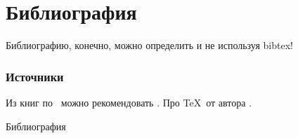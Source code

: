 \section{Библиография}

Библиографию, конечно, можно определить и не используя bibtex!

\begin{frame}
    \frametitle{Источники}
    
    Из книг по \LaTeXe\ можно рекомендовать \cite{bib:cotelnikov,bib:baldin}. Про \TeX\ от автора \cite{bib:knuth:AllAbout}.
\end{frame}


\begin{frame}[allowframebreaks]{Библиография}

    
    
\end{frame}





